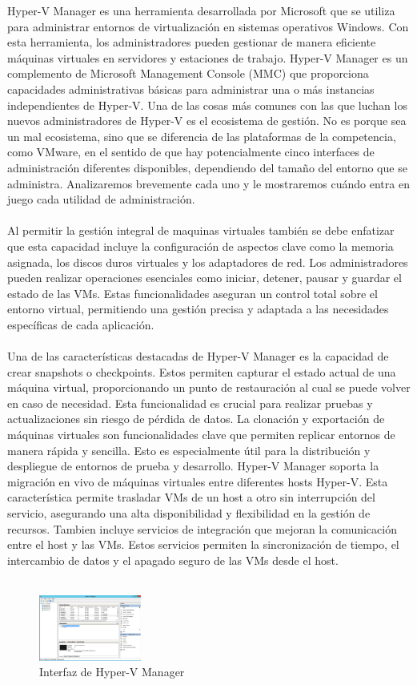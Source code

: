 \documentclass[journal]{IEEEtran}
\begin{document}
Hyper-V Manager es una herramienta desarrollada por Microsoft que se utiliza para administrar entornos de virtualización en sistemas operativos Windows. Con esta herramienta, los administradores pueden gestionar de manera eficiente máquinas virtuales en servidores y estaciones de trabajo. 
Hyper-V Manager es un complemento de Microsoft Management Console (MMC) que proporciona capacidades administrativas básicas para administrar una o más instancias independientes de Hyper-V. Una de las cosas más comunes con las que luchan los nuevos administradores de Hyper-V es el ecosistema de gestión. No es porque sea un mal ecosistema, sino que se diferencia de las plataformas de la competencia, como VMware, en el sentido de que hay potencialmente cinco interfaces de administración diferentes disponibles, dependiendo del tamaño del entorno que se administra. Analizaremos brevemente cada uno y le mostraremos cuándo entra en juego cada utilidad de administración. \cite{HVM} 
\\ \\
Al permitir la gestión integral de maquinas virtuales también se debe enfatizar que esta capacidad incluye la configuración de aspectos clave como la memoria asignada, los discos duros virtuales y los adaptadores de red. Los administradores pueden realizar operaciones esenciales como iniciar, detener, pausar y guardar el estado de las VMs. Estas funcionalidades aseguran un control total sobre el entorno virtual, permitiendo una gestión precisa y adaptada a las necesidades específicas de cada aplicación.
\\ \\
Una de las características destacadas de Hyper-V Manager es la capacidad de crear snapshots o checkpoints. Estos permiten capturar el estado actual de una máquina virtual, proporcionando un punto de restauración al cual se puede volver en caso de necesidad. Esta funcionalidad es crucial para realizar pruebas y actualizaciones sin riesgo de pérdida de datos. La clonación y exportación de máquinas virtuales son funcionalidades clave que permiten replicar entornos de manera rápida y sencilla. Esto es especialmente útil para la distribución y despliegue de entornos de prueba y desarrollo. Hyper-V Manager soporta la migración en vivo de máquinas virtuales entre diferentes hosts Hyper-V. Esta característica permite trasladar VMs de un host a otro sin interrupción del servicio, asegurando una alta disponibilidad y flexibilidad en la gestión de recursos. Tambien incluye servicios de integración que mejoran la comunicación entre el host y las VMs. Estos servicios permiten la sincronización de tiempo, el intercambio de datos y el apagado seguro de las VMs desde el host. \cite{HVMM}
\\ \\
\begin{figure}
    \centering
    \includegraphics[width=0.3\textwidth]{Interfaz HVM.png}
    \caption{Interfaz de Hyper-V Manager}
\end{figure}
\end{document}
